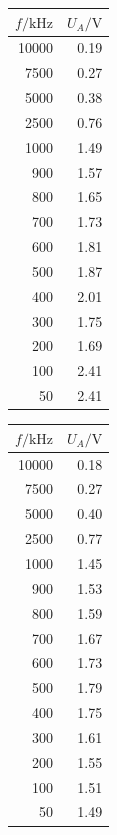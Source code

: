 \documentclass[]{scrartcl}
\begin{document}
\begin{table}[H]
	\centering
	\label{tab:integrator}
	\hskip-1.50cm
	\begin{tabular}{r r}
		\toprule
		$f / \si{\kilo\hertz}$ & $U_A / \si{\volt}$ \\
		\midrule
		10000 & 0.19 \\
		7500  & 0.27 \\
		5000  & 0.38 \\
		2500  & 0.76 \\
		1000  & 1.49 \\
		900   & 1.57 \\
		800   & 1.65 \\
		700   & 1.73 \\
		600   & 1.81 \\
		500   & 1.87 \\
		400   & 2.01 \\
		300   & 1.75 \\
		200   & 1.69 \\
		100   & 2.41 \\
		50    & 2.41 \\
		\bottomrule
	\end{tabular}
\end{table}

\begin{table}[H]
	\centering
	\label{tab:differentiator}
	\hskip-1.50cm
	\begin{tabular}{r r}
		\toprule
		$f / \si{\kilo\hertz}$ & $U_A / \si{\volt}$ \\
		\midrule
		10000 & 0.18 \\
		7500  & 0.27 \\
		5000  & 0.40 \\
		2500  & 0.77 \\
		1000  & 1.45 \\
		900   & 1.53 \\
		800   & 1.59 \\
		700   & 1.67 \\
		600   & 1.73 \\
		500   & 1.79 \\
		400   & 1.75 \\
		300   & 1.61 \\
		200   & 1.55 \\
		100   & 1.51 \\
		50    & 1.49 \\
		\bottomrule
	\end{tabular}
\end{table}
\end{document}
